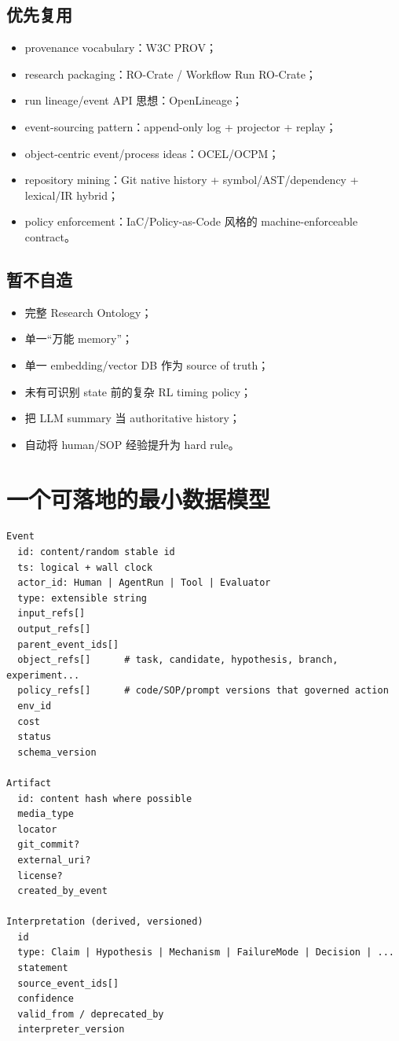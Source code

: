 \documentclass[11pt,a4paper]{ctexart}
\begin{document}
\subsection{优先复用}
\begin{itemize}
\item provenance vocabulary：W3C PROV；
\item research packaging：RO-Crate / Workflow Run RO-Crate；
\item run lineage/event API 思想：OpenLineage；
\item event-sourcing pattern：append-only log + projector + replay；
\item object-centric event/process ideas：OCEL/OCPM；
\item repository mining：Git native history + symbol/AST/dependency + lexical/IR hybrid；
\item policy enforcement：IaC/Policy-as-Code 风格的 machine-enforceable contract。
\end{itemize}

\subsection{暂不自造}
\begin{itemize}
\item 完整 Research Ontology；
\item 单一“万能 memory”；
\item 单一 embedding/vector DB 作为 source of truth；
\item 未有可识别 state 前的复杂 RL timing policy；
\item 把 LLM summary 当 authoritative history；
\item 自动将 human/SOP 经验提升为 hard rule。
\end{itemize}

\section{一个可落地的最小数据模型}

\begin{verbatim}
Event
  id: content/random stable id
  ts: logical + wall clock
  actor_id: Human | AgentRun | Tool | Evaluator
  type: extensible string
  input_refs[]
  output_refs[]
  parent_event_ids[]
  object_refs[]      # task, candidate, hypothesis, branch, experiment...
  policy_refs[]      # code/SOP/prompt versions that governed action
  env_id
  cost
  status
  schema_version

Artifact
  id: content hash where possible
  media_type
  locator
  git_commit?
  external_uri?
  license?
  created_by_event

Interpretation (derived, versioned)
  id
  type: Claim | Hypothesis | Mechanism | FailureMode | Decision | ...
  statement
  source_event_ids[]
  confidence
  valid_from / deprecated_by
  interpreter_version
\end{verbatim}
\end{document}
